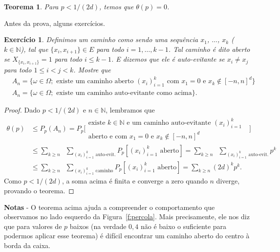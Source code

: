 \documentclass[reqno, final]{book}
\newcommand*\1{\mathds{1}}
\newtheorem{theorem}{Teorema}[section]
\newtheorem{exercise}[example]{Exercício}
\begin{document}
\begin{theorem}
  Para $p < 1/(2d)$, temos que $\theta(p) = 0$.
\end{theorem}

Antes da prova, alguns exercícios.

\begin{exercise}
  Definimos um caminho como sendo uma sequência $x_1$, $\dots$, $x_k$ ($k \in \mathbb{N}$), tal que $\{x_i, x_{i+1}\} \in E$ para todo $i = 1, \dots, k-1$.
  Tal caminho é dito aberto se $X_{\{x_i, x_{i+1}\}} = 1$ para todo $i \leq k-1$.
  E dizemos que ele é auto-evitante se $x_i \neq x_j$ para todo $1 \leq i < j < k$.
  Mostre que
  \begin{equation*}
    \begin{split}
      & A_n = \Big\{ \omega \in \Omega; \text{ existe um caminho aberto $(x_i)_{i=1}^{k}$ com $x_1 = 0$ e $x_k \not \in [-n, n]^d$} \Big\}\\
      & A_n = \big\{ \omega \in \Omega; \text{ existe um caminho auto-evitante como acima} \big\}.
    \end{split}
  \end{equation*}
\end{exercise}

\begin{proof}
  Dado $p < 1/(2d)$ e $n \in \mathbb{N}$, lembramos que
  \begin{equation*}
    \begin{split}
      \theta(p) & \leq P_p(A_n) = P_p \Big[
      \begin{array}{c}
      \text{existe $k \in \mathbb{N}$ e um caminho auto-evitante $(x_i)_{i=1}^k$ }\\
      \text{aberto e com $x_1 = 0$ e $x_k \not \in [-n, n]^d$}
    \end{array} \Big]\\[2mm]
    & \leq \sum_{k \geq n} \; \; \sum_{(x_i)_{i=1}^k \text{ auto-evit.}} P_p [(x_i)_{i=1}^k \text{ aberto}] = \sum_{k \geq n} \; \; \sum_{(x_i)_{i=1}^k \text{ auto-evit.}} p^k\\
    & \leq \sum_{k \geq n} \; \; \sum_{(x_i)_{i=1}^k \text{ caminho}} P_p [(x_i)_{i=1}^k \text{ aberto}] = \sum_{k \geq n} (2d)^k p^k.
    \end{split}
  \end{equation*}
  Como $p < 1/(2d)$, a soma acima é finita e converge a zero quando $n$ diverge, provando o teorema.
\end{proof}

{\bf Notas} - O teorema acima ajuda a compreender o comportamento que observamos no lado esquerdo da Figura~\ref{f:percola}.
Mais precisamente, ele nos diz que para valores de $p$ baixos (na verdade $0,4$ não é baixo o suficiente para podermos aplicar esse teorema) é difícil encontrar um caminho aberto do centro à borda da caixa.
\end{document}
